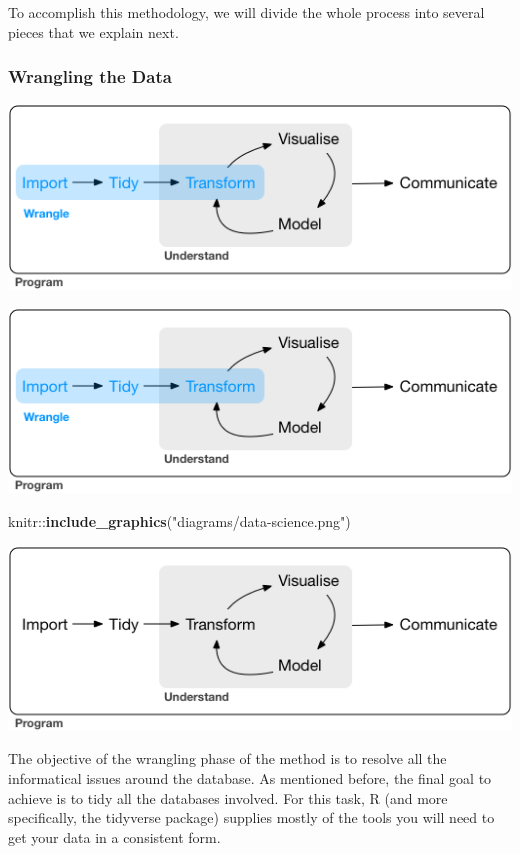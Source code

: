 \documentclass[]{book}
\newenvironment{Shaded}{\begin{snugshade}}{\end{snugshade}}
\newcommand{\KeywordTok}[1]{\textcolor[rgb]{0.13,0.29,0.53}{\textbf{{#1}}}}
\newcommand{\StringTok}[1]{\textcolor[rgb]{0.31,0.60,0.02}{{#1}}}
\newcommand{\NormalTok}[1]{{#1}}
\begin{document}
To accomplish this methodology, we will divide the whole process into
several pieces that we explain next.

\subsubsection{Wrangling the Data}\label{wrangling-the-data}

\includegraphics[width=7.18in]{diagrams/data-science-wrangle}

\includegraphics[width=0.5\linewidth]{diagrams/data-science-wrangle}

\begin{Shaded}
\begin{Highlighting}[]
\NormalTok{knitr::}\KeywordTok{include_graphics}\NormalTok{(}\StringTok{"diagrams/data-science.png"}\NormalTok{)}
\end{Highlighting}
\end{Shaded}

\includegraphics[width=7.18in]{diagrams/data-science}

The objective of the wrangling phase of the method is to resolve all the
informatical issues around the database. As mentioned before, the final
goal to achieve is to tidy all the databases involved. For this task, R
(and more specifically, the tidyverse package) supplies mostly of the
tools you will need to get your data in a consistent form.
\end{document}
